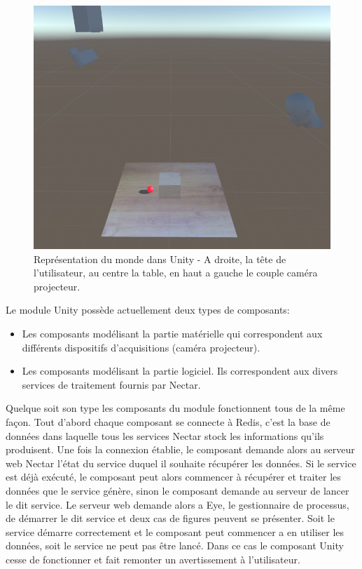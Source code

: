 \begin{figure}[H]
\centering
\includegraphics[width=0.7\linewidth]{images/unityscene}
\caption{Représentation du monde dans Unity - A droite, la tête de l'utilisateur, au centre la table, en haut a gauche le couple caméra projecteur.}
\label{fig:unityrealworld}
\end{figure}

Le module Unity possède actuellement deux types de composants:
\begin{itemize}
\item Les composants modélisant la partie matérielle qui correspondent aux différents dispositifs d'acquisitions (caméra projecteur).
\item Les composants modélisant la partie logiciel. Ils correspondent aux divers services de traitement fournis par Nectar.
\end{itemize}

Quelque soit son type les composants du module fonctionnent tous de la même façon. Tout d'abord chaque composant se connecte à Redis, c'est la base de données dans laquelle tous les services Nectar stock les informations qu'ils produisent. Une fois la connexion établie, le composant demande alors au serveur web Nectar l'état du service duquel il souhaite récupérer les données. Si le service est déjà exécuté, le composant peut alors commencer à récupérer et traiter les données que le service génère, sinon le composant demande au serveur de lancer le dit service. Le serveur web demande alors a Eye, le gestionnaire de processus, de démarrer le dit service et deux cas de figures peuvent se présenter. Soit le service démarre correctement et le composant peut commencer a en utiliser les données, soit le service ne peut pas être lancé. Dans ce cas le composant Unity cesse de fonctionner et fait remonter un avertissement à l'utilisateur.

